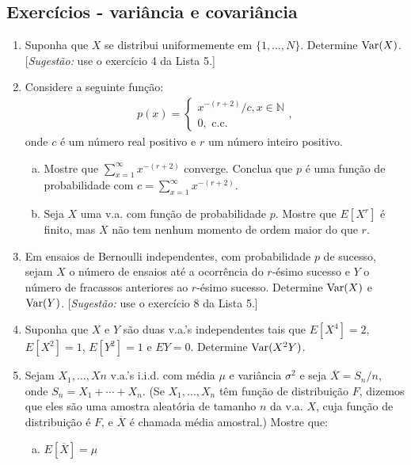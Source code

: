 \documentclass[../Notas.tex]{subfiles}
\begin{document}
\subsection{Exercícios - variância e covariância}

\begin{enumerate}
    \item Suponha que $X$ se distribui uniformemente em $\{1,\dots, N\}$. Determine $\text{Var}(X)$. [\textit{Sugestão:} use o exercício 4 da Lista 5.]
    \item Considere a seguinte função:
    \begin{align*}
        p(x) = \begin{cases}
            x^{-(r+2)}/c, x\in\mathbb{N} \\
            0, \text{ c.c.}
        \end{cases},
    \end{align*}
    onde $c$ é um número real positivo e $r$ um número inteiro positivo.
    \begin{enumerate}[a)]
    \item Mostre que $\displaystyle{ \sum_{x=1}^{\infty} x^{-(r+2)} }$ converge. Conclua que $p$ é uma função de probabilidade com $c = \displaystyle{ \sum_{x=1}^{\infty} x^{-(r+2)} }$.
    \item Seja $X$ uma v.a. com função de probabilidade $p$. Mostre que $E[X^r]$ é finito, mas $X$ não tem nenhum momento de ordem maior do que $r$.
    \end{enumerate}
    \item Em ensaios de Bernoulli independentes, com probabilidade $p$ de sucesso, sejam $X$ o número de ensaios até a ocorrência do $r$-ésimo sucesso e $Y$ o número de fracassos anteriores ao $r$-ésimo sucesso. Determine $\text{Var}(X)$ e $\text{Var}(Y)$. [\textit{Sugestão:} use o exercício 8 da Lista 5.]
    \item Suponha que $X$ e $Y$ são duas v.a.’s independentes tais que $E[X^4] = 2$, $E[X^2] = 1$, $E[Y^2] = 1$ e $EY = 0.$ Determine $\text{Var}(X^2Y)$.
    \item Sejam $X_1 ,\dots, X n$ v.a.’s i.i.d. com média $\mu$ e variância $\sigma^2$ e seja $\overline{X} = S_n/n$, onde $S_n = X_1 + \cdots + X_n$. (Se $X_1,\dots, X_n$ têm função de distribuição $F$, dizemos que eles são uma amostra aleatória de tamanho $n$ da v.a. $X$, cuja função de distribuição é $F$, e $\overline{X}$ é chamada média amostral.) Mostre que:
    \begin{enumerate}[a)]
    \item $E[\overline{X}] = \mu$

\end{enumerate}
\end{enumerate}
\end{document}
